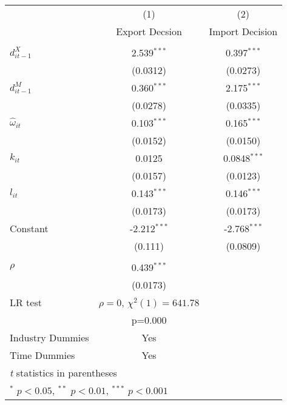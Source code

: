 \begin{center}
\begin{tabular}{l*{2}{c}}
\hline\hline
            &\multicolumn{1}{c}{(1)}&\multicolumn{1}{c}{(2)}\\
            &\multicolumn{1}{c}{Export
              Decsion}&\multicolumn{1}{c}{Import Decision}\\
\hline\\
$d_{it-1}^{X}$   &       2.539$^{***}$   &       0.397$^{***}$\\
            &        (0.0312)            &    (0.0273)         \\
[1em]                                                          
$d_{it-1}^{M}$   &       0.360$^{***}$   &       2.175$^{***}$\\
            &        (0.0278)            &    (0.0335)         \\
[1em]                                                          
$\hat{\omega}_{it}$&       0.103$^{***}$   &       0.165$^{***}$\\
            &        (0.0152)            &    (0.0150)         \\
[1em]                                                          
$k_{it}$       &       0.0125            &      0.0848$^{***}$\\
            &        (0.0157)            &    (0.0123)         \\
[1em]                                                          
$l_{it}$     &          0.143$^{***}$   &       0.146$^{***}$\\
            &        (0.0173)            &    (0.0173)         \\
[1em]                                                          
Constant      &        -2.212$^{***}$   &      -2.768$^{***}$\\
            &         (0.111)            &    (0.0809)         \\
\hline
\hline
      &                     \\
$\rho$      &       0.439$^{***}$\\
            &    (0.0173)         \\
LR test& $\rho=0$, $\chi^{2}(1)= 641.78$&\\
& p=0.000&\\
Industry Dummies & Yes& \\
Time Dummies& Yes& \\
\hline\hline
\multicolumn{2}{l}{\footnotesize \textit{t} statistics in parentheses}\\
\multicolumn{2}{l}{\footnotesize $^{*}$ \(p<0.05\), $^{**}$ \(p<0.01\), $^{***}$ \(p<0.001\)}\\
\end{tabular}
\end{center}
